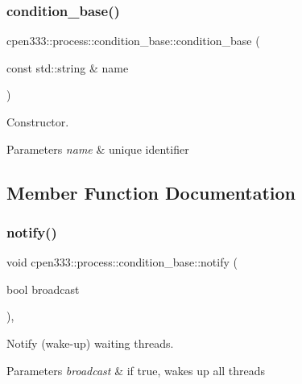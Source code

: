 \subsubsection{\texorpdfstring{condition\+\_\+base()}{condition\_base()}}
{\footnotesize\ttfamily cpen333\+::process\+::condition\+\_\+base\+::condition\+\_\+base (\begin{DoxyParamCaption}\item[{const std\+::string \&}]{name }\end{DoxyParamCaption})\hspace{0.3cm}{\ttfamily [inline]}}



Constructor. 


\begin{DoxyParams}{Parameters}
{\em name} & unique identifier \\
\hline
\end{DoxyParams}


\subsection{Member Function Documentation}
\mbox{\label{classcpen333_1_1process_1_1condition__base_af6f7110f5be9935ac2fbea2b303a2903}} 
\subsubsection{\texorpdfstring{notify()}{notify()}}
{\footnotesize\ttfamily void cpen333\+::process\+::condition\+\_\+base\+::notify (\begin{DoxyParamCaption}\item[{bool}]{broadcast }\end{DoxyParamCaption})\hspace{0.3cm}{\ttfamily [inline]}, {\ttfamily [protected]}}



Notify (wake-\/up) waiting threads. 


\begin{DoxyParams}{Parameters}
{\em broadcast} & if true, wakes up all threads \\
\hline
\end{DoxyParams}
\mbox{\label{classcpen333_1_1process_1_1condition__base_a37b38d480898c0cc13b0ea1eb2b24127}} 
